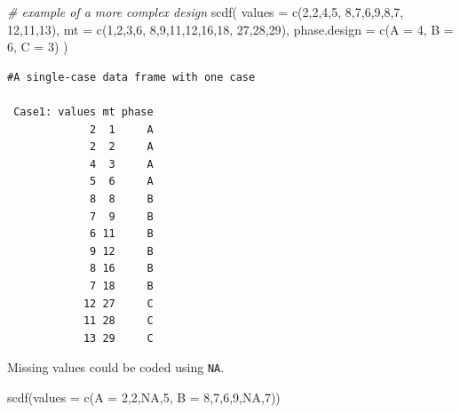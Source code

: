 \documentclass[
]{book}
\newenvironment{Shaded}{\begin{snugshade}}{\end{snugshade}}
\newcommand{\AttributeTok}[1]{\textcolor[rgb]{0.77,0.63,0.00}{#1}}
\newcommand{\CommentTok}[1]{\textcolor[rgb]{0.56,0.35,0.01}{\textit{#1}}}
\newcommand{\ConstantTok}[1]{\textcolor[rgb]{0.00,0.00,0.00}{#1}}
\newcommand{\DecValTok}[1]{\textcolor[rgb]{0.00,0.00,0.81}{#1}}
\newcommand{\FunctionTok}[1]{\textcolor[rgb]{0.00,0.00,0.00}{#1}}
\newcommand{\NormalTok}[1]{#1}
\begin{document}
\begin{Shaded}
\begin{Highlighting}[]
\CommentTok{\# example of a more complex design }
\FunctionTok{scdf}\NormalTok{(}
  \AttributeTok{values =} \FunctionTok{c}\NormalTok{(}\DecValTok{2}\NormalTok{,}\DecValTok{2}\NormalTok{,}\DecValTok{4}\NormalTok{,}\DecValTok{5}\NormalTok{, }\DecValTok{8}\NormalTok{,}\DecValTok{7}\NormalTok{,}\DecValTok{6}\NormalTok{,}\DecValTok{9}\NormalTok{,}\DecValTok{8}\NormalTok{,}\DecValTok{7}\NormalTok{, }\DecValTok{12}\NormalTok{,}\DecValTok{11}\NormalTok{,}\DecValTok{13}\NormalTok{), }
  \AttributeTok{mt =} \FunctionTok{c}\NormalTok{(}\DecValTok{1}\NormalTok{,}\DecValTok{2}\NormalTok{,}\DecValTok{3}\NormalTok{,}\DecValTok{6}\NormalTok{, }\DecValTok{8}\NormalTok{,}\DecValTok{9}\NormalTok{,}\DecValTok{11}\NormalTok{,}\DecValTok{12}\NormalTok{,}\DecValTok{16}\NormalTok{,}\DecValTok{18}\NormalTok{, }\DecValTok{27}\NormalTok{,}\DecValTok{28}\NormalTok{,}\DecValTok{29}\NormalTok{),}
  \AttributeTok{phase.design =} \FunctionTok{c}\NormalTok{(}\AttributeTok{A =} \DecValTok{4}\NormalTok{, }\AttributeTok{B =} \DecValTok{6}\NormalTok{, }\AttributeTok{C =} \DecValTok{3}\NormalTok{)}
\NormalTok{)}
\end{Highlighting}
\end{Shaded}

\begin{verbatim}
#A single-case data frame with one case

 Case1: values mt phase
             2  1     A
             2  2     A
             4  3     A
             5  6     A
             8  8     B
             7  9     B
             6 11     B
             9 12     B
             8 16     B
             7 18     B
            12 27     C
            11 28     C
            13 29     C
\end{verbatim}

Missing values could be coded using \texttt{NA}.

\begin{Shaded}
\begin{Highlighting}[]
\FunctionTok{scdf}\NormalTok{(}\AttributeTok{values =} \FunctionTok{c}\NormalTok{(}\AttributeTok{A =} \DecValTok{2}\NormalTok{,}\DecValTok{2}\NormalTok{,}\ConstantTok{NA}\NormalTok{,}\DecValTok{5}\NormalTok{, }\AttributeTok{B =} \DecValTok{8}\NormalTok{,}\DecValTok{7}\NormalTok{,}\DecValTok{6}\NormalTok{,}\DecValTok{9}\NormalTok{,}\ConstantTok{NA}\NormalTok{,}\DecValTok{7}\NormalTok{))}
\end{Highlighting}
\end{Shaded}
\end{document}
